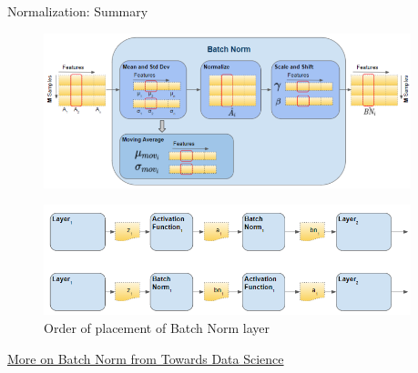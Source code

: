 \begin{frame}{Normalization: Summary}
    \begin{figure}
    \centering
    \includegraphics[width=0.95\textwidth,height=0.4\textheight,keepaspectratio]{images/cnn/batch-norm-unit.png}
    \end{figure}

    \begin{figure}
    \centering
    \includegraphics[width=0.95\textwidth,height=0.4\textheight,keepaspectratio]{images/cnn/batch-norm-sequence.png}
    \caption*{Order of placement of Batch Norm layer}
    \end{figure}
    \vspace{-0.5cm}
    \href{https://towardsdatascience.com/batch-norm-explained-visually-how-it-works-and-why-neural-networks-need-it-b18919692739/}{More on Batch Norm from Towards Data Science}
\end{frame}